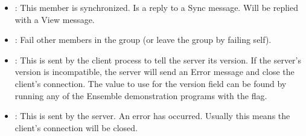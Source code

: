 \begin{itemize}
\begin{FormatTable}
\end{FormatTable}
\item 
{} : This member is synchronized.  Is a reply to a
Sync message.  Will be replied with a View message.
\begin{FormatTable}
\end{FormatTable}
\item 
{} : Fail other members in the group (or leave the
group by failing self).
\begin{FormatTable}
\end{FormatTable}
\item 
{} : This is sent by the client process to tell
the server its version.  If the server's version is incompatible, the
server will send an Error message and close the client's connection.
The value to use for the version field can be found by running any of
the Ensemble demonstration programs with the  flag.
\begin{FormatTable}
\end{FormatTable}
\item
{} : This is sent by the server.  An error has 
occurred.  Usually this means the client's connection will be closed.
\begin{FormatTable}
\end{FormatTable}

\end{itemize}
